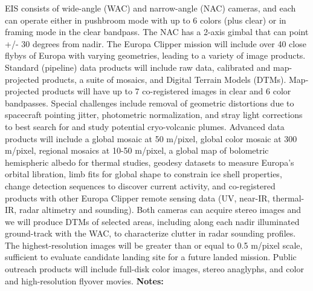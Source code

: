 \documentclass{report}
\begin{document}
{{{{{{{{{{{{{{{{{{{{{{{{{{{{{{{{{{{{{{{{{{{{{{{{{{{{{{{{{{{{{{{{{{{{{{{{{{{{{{{{{{{{{{{{{{{{{{{{{{{{{{{{{{{{{{{{{{{{{{{{{{{{{{{{{{{{{{{{{{{{{{{{{{{EIS consists of wide-angle (WAC) and narrow-angle (NAC) cameras, and each can operate either in pushbroom mode with up to 6 colors (plus clear) or in framing mode in the clear bandpass.  The NAC has a 2-axis gimbal that can point +/- 30 degrees from nadir.  The Europa Clipper mission will include over 40 close flybys of Europa with varying geometries, leading to a variety of image products.  Standard (pipeline) data products will include raw data, calibrated and map-projected products, a suite of mosaics, and Digital Terrain Models (DTMs).   Map-projected products will have up to 7 co-registered images in clear and 6 color bandpasses.  Special challenges include removal of geometric distortions due to spacecraft pointing jitter, photometric normalization,  and stray light corrections to best search for and study potential cryo-volcanic plumes.  Advanced data products will include a global mosaic at 50 m/pixel, global color mosaic at 300 m/pixel, regional mosaics at 10-50 m/pixel, a global map of bolometric hemispheric albedo for thermal studies, geodesy datasets to measure Europa’s orbital libration, limb fits for global shape to constrain ice shell properties, change detection sequences to discover current activity, and co-registered products with other Europa Clipper remote sensing data (UV, near-IR, thermal-IR, radar altimetry and sounding).   Both cameras can acquire stereo images and we will produce DTMs of selected areas, including along each nadir illuminated ground-track with the WAC, to characterize clutter in radar sounding profiles.  The highest-resolution images will be greater than or equal to 0.5 m/pixel scale, sufficient to evaluate candidate landing site for a future landed mission.  Public outreach products will include full-disk color images, stereo anaglyphs, and color and high-resolution flyover movies.\newline
{\bf Notes:}\newline
{\newpage
}}}}}}}}}}}}}}}}}}}}}}}}}}}}}}}}}}}}}}}}}}}}}}}}}}}}}}}}}}}}}}}}}}}}}}}}}}}}}}}}}}}}}}}}}}}}}}}}}}}}}}}}}}}}}}}}}}}}}}}}}}}}}}}}}}}}}}}}}}}}}}}}}}}}
\end{document}
